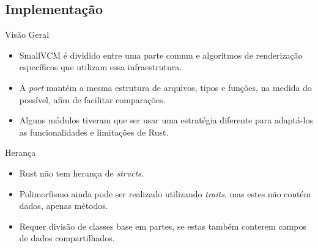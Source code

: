\documentclass{beamer}
\begin{document}
\subsection{Implementação}
\begin{frame}{Visão Geral}
	\begin{itemize}
		\item SmallVCM é dividido entre uma parte comum e algoritmos de renderização específicos que utilizam essa infraestrutura.
		\item A \emph{port} mantém a mesma estrutura de arquivos, tipos e funções, na medida do possível, afim de facilitar comparações.
		\item Alguns módulos tiveram que ser usar uma estratégia diferente para adaptá-los as funcionalidades e limitações de Rust.
	\end{itemize}
\end{frame}

\begin{frame}{Herança}
	\begin{itemize}
		\item Rust não tem herança de \emph{structs}.
		\item Polimorfismo ainda pode ser realizado utilizando \emph{traits}, mas estes não contém dados, apenas métodos.
		\item Requer divisão de classes base em partes, se estas também conterem campos de dados compartilhados.
	\end{itemize}
\end{frame}
\end{document}
